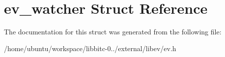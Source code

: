 \hypertarget{structev__watcher}{\section{ev\-\_\-watcher Struct Reference}
\label{structev__watcher}
}


The documentation for this struct was generated from the following file\-:\begin{DoxyCompactItemize}
\item 
/home/ubuntu/workspace/libbitc-\/0../external/libev/ev.\-h\end{DoxyCompactItemize}
